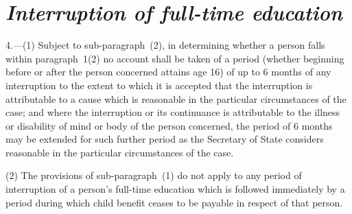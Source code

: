 \documentclass[12pt,a4paper]{article}
\begin{document}
\section*{\itshape Interruption of full-time education}

4.---(1)  Subject to sub-paragraph~(2), in determining whether a person falls within 
paragraph~1(2)  %
no account shall be taken of a period (whether beginning before or after the person concerned attains age 16) of up to 6 months of any interruption to the extent to which it is accepted that the interruption is attributable to a cause which is reasonable in the particular circumstances of the case; and where the interruption or its continuance is attributable to the illness or disability of mind or body of the person concerned, the period of 6 months may be extended for such further period as the Secretary of State considers reasonable in the particular circumstances of the case.

%

(2) The provisions of sub-paragraph~(1) do not apply to any period of interruption of a person’s full-time education which is followed immediately by a period during which child benefit ceases to be payable in respect of that person.

\end{document}
